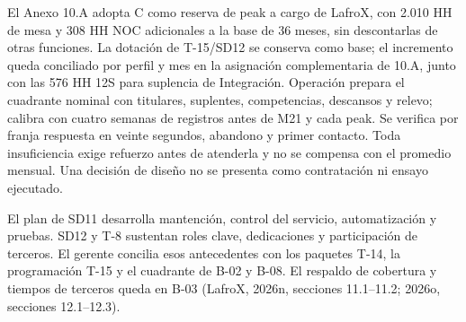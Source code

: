 \begin{description}[style=nextline,leftmargin=0pt,labelwidth=0pt,labelsep=0pt,font=\normalfont\intersemibold]
\item[B-08. Cuadrante y calibración de la mesa.]
El Anexo 10.A adopta C como reserva de peak a cargo de LafroX, con 2.010 HH de mesa y 308 HH NOC adicionales a la base de 36 meses, sin descontarlas de otras funciones. La dotación de T-15/SD12 se conserva como base; el incremento queda conciliado por perfil y mes en la asignación complementaria de 10.A, junto con las 576 HH 12S para suplencia de Integración. Operación prepara el cuadrante nominal con titulares, suplentes, competencias, descansos y relevo; calibra con cuatro semanas de registros antes de M21 y cada peak. Se verifica por franja respuesta en veinte segundos, abandono y primer contacto. Toda insuficiencia exige refuerzo antes de atenderla y no se compensa con el promedio mensual. Una decisión de diseño no se presenta como contratación ni ensayo ejecutado.

\item[B-09. Dependencias documentales SD11 y SD12.]
El plan de SD11 desarrolla mantención, control del servicio, automatización y pruebas. SD12 y T-8 sustentan roles clave, dedicaciones y participación de terceros. El gerente concilia esos antecedentes con los paquetes T-14, la programación T-15 y el cuadrante de B-02 y B-08. El respaldo de cobertura y tiempos de terceros queda en B-03 (LafroX, 2026n, secciones 11.1--11.2; 2026o, secciones 12.1--12.3).


\end{description}
